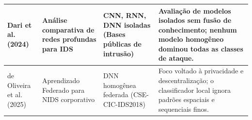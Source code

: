 \begin{table}[htbp]
\begin{tabularx}{\textwidth}{|>{\raggedright\arraybackslash}p{2.6cm}|>{\raggedright\arraybackslash}p{3.2cm}|>{\raggedright\arraybackslash}p{2.8cm}|>{\raggedright\arraybackslash}X|}
\hline
Dari et al. (2024) \cite{neuralcyber2025} & Análise comparativa de redes profundas para IDS & CNN, RNN, DNN isoladas \newline (Bases públicas de intrusão) & Avaliação de modelos isolados sem fusão de conhecimento; nenhum modelo homogêneo dominou todas as classes de ataque. \\
\hline
de Oliveira et al. (2025) \cite{fnids2025} & Aprendizado Federado para NIDS corporativo & DNN homogênea federada \newline (CSE-CIC-IDS2018) & Foco voltado à privacidade e descentralização; o classificador local ignora padrões espaciais e sequenciais finos. \\
\hline
\end{tabularx}
\end{table}

